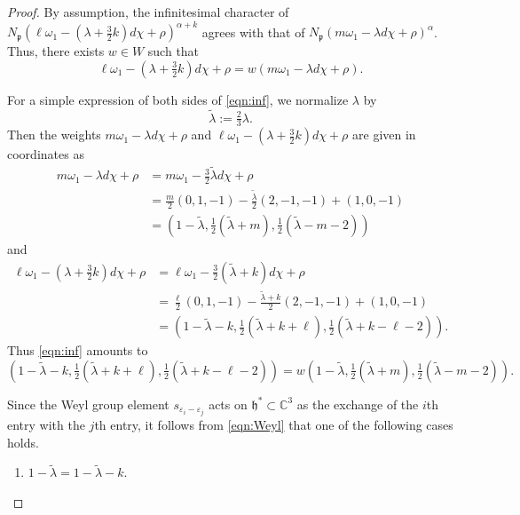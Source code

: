 \documentclass[reqno,11pt]{amsart}
\theoremstyle{remark}
\numberwithin{equation}{section}
\newcommand{\ga}{\alpha}
\newcommand{\eps}{\varepsilon}
\newcommand{\fh}{{\mathfrak h}}
\newcommand{\fp}{{\mathfrak p}}
\newcommand{\C}{\mathbb{C}}
\newcommand{\wlambda}{\widetilde{\lambda}}
\begin{document}
\begin{proof}
By assumption,
the infinitesimal character of 
$N_\fp(\ell\omega_1 -(\lambda +\tfrac{3}{2}k)d\chi+\rho)^{\ga+k}$
agrees with that of $N_\fp(m\omega_1 -\lambda d\chi+\rho)^\ga$. 
Thus, there exists $w \in W$ such that
\begin{equation}\label{eqn:inf}
\ell\omega_1 -(\lambda +\tfrac{3}{2}k)d\chi+\rho
=w(m\omega_1 -\lambda d\chi+\rho).
\end{equation}

For a simple expression of both sides of \eqref{eqn:inf}, we normalize $\lambda$ by
\begin{equation*}
\wlambda:=\tfrac{2}{3}\lambda.
\end{equation*}
Then the weights $m\omega_1 -\lambda d\chi+\rho$ and 
$\ell\omega_1 -(\lambda +\tfrac{3}{2}k)d\chi+\rho$ are given in coordinates as
\begin{align*}
m\omega_1 -\lambda d\chi+\rho
&=m\omega_1 -\tfrac{3}{2}\wlambda d\chi+\rho\\
&=\tfrac{m}{2}(0, 1, -1) - \tfrac{\wlambda}{2}(2,-1,-1) + (1,0,-1)\\
&=
(1-\wlambda, \tfrac{1}{2}(\wlambda+m),\tfrac{1}{2}(\wlambda-m-2))
\end{align*}
and
\begin{align*}
\ell\omega_1 -(\lambda +\tfrac{3}{2}k)d\chi+\rho
&=\ell\omega_1 -\tfrac{3}{2}(\wlambda +k)d\chi+\rho\\
&=\tfrac{\ell}{2}(0,1,-1)-\tfrac{\wlambda+k}{2}(2,-1,-1)+(1,0,-1)\\
&=
(1-\wlambda-k, \tfrac{1}{2}(\wlambda+k+\ell), \tfrac{1}{2}(\wlambda+k-\ell-2)).
\end{align*}
Thus \eqref{eqn:inf}  amounts to
\begin{equation*}
(1-\wlambda-k, \tfrac{1}{2}(\wlambda+k+\ell), \tfrac{1}{2}(\wlambda+k-\ell-2))
=w(1-\wlambda, \tfrac{1}{2}(\wlambda+m),\tfrac{1}{2}(\wlambda-m-2)).
\end{equation*}

\noindent
Since the Weyl group element $s_{\eps_i-\eps_j}$ acts on $\fh^*\subset \C^3$
as the exchange of the $i$th entry with the $j$th entry, 
it follows from \eqref{eqn:Weyl} that one of the following cases holds.

\begin{enumerate}[(1)]

\item $1-\wlambda =1-\wlambda-k$.

\vskip 0.05in


\end{enumerate}
\end{proof}
\end{document}

